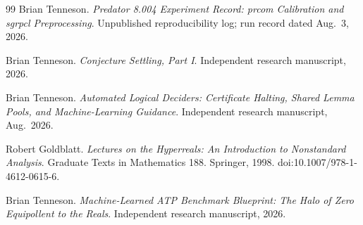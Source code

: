 \documentclass[11pt,oneside]{book}
\theoremstyle{definition}
\theoremstyle{remark}
\begin{document}
\begin{thebibliography}{99}
Brian Tenneson.
\newblock \emph{Predator 8.004 Experiment Record: prcom Calibration and sgrpcl Preprocessing}.
\newblock Unpublished reproducibility log; run record dated Aug.~3, 2026.

Brian Tenneson.
\newblock \emph{Conjecture Settling, Part I}.
\newblock Independent research manuscript, 2026.

Brian Tenneson.
\newblock \emph{Automated Logical Deciders: Certificate Halting, Shared Lemma Pools, and Machine-Learning Guidance}.
\newblock Independent research manuscript, Aug.~2026.

Robert Goldblatt.
\newblock \emph{Lectures on the Hyperreals: An Introduction to Nonstandard Analysis}.
\newblock Graduate Texts in Mathematics 188. Springer, 1998.
\newblock doi:10.1007/978-1-4612-0615-6.

Brian Tenneson.
\newblock \emph{Machine-Learned ATP Benchmark Blueprint: The Halo of Zero Equipollent to the Reals}.
\newblock Independent research manuscript, 2026.

\end{thebibliography}
\end{document}
